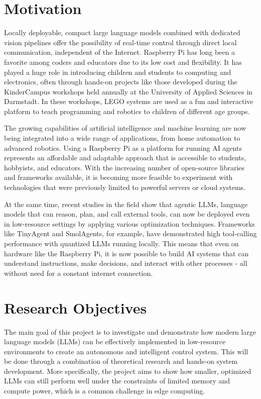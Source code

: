 %
%
\section{Motivation}
\label{sec:intro:motivation}


Locally deployable, compact large language models combined with dedicated vision pipelines offer the possibility of real-time control through direct local communication, independent of the Internet. Raspberry Pi has long been a favorite among coders and educators due to its low cost and flexibility. It has played a huge role in introducing children and students to computing and electronics, often through hands-on projects like those developed during the KinderCampus workshops held annually at the University of Applied Sciences in Darmstadt. In these workshops, LEGO systems are used as a fun and interactive platform to teach programming and robotics to children of different age groups.

The growing capabilities of artificial intelligence and machine learning are now being integrated into a wide range of applications, from home automation to advanced robotics. Using a Raspberry Pi as a platform for running AI agents represents an affordable and adaptable approach that is accessible to students, hobbyists, and educators. With the increasing number of open-source libraries and frameworks available, it is becoming more feasible to experiment with technologies that were previously limited to powerful servers or cloud systems.

At the same time, recent studies in the field show that agentic LLMs, language models that can reason, plan, and call external tools, can now be deployed even in low-resource settings by applying various optimization techniques. Frameworks like TinyAgent and SmolAgents, for example, have demonstrated high tool-calling performance with quantized LLMs running locally. This means that even on hardware like the Raspberry Pi, it is now possible to build AI systems that can understand instructions, make decisions, and interact with other processes - all without need for a constant internet connection.

%
%
\section{Research Objectives}
\label{sec:intro:goal}

The main goal of this project is to investigate and demonstrate how modern large language models (LLMs) can be effectively implemented in low-resource environments to create an autonomous and intelligent control system. This will be done through a combination of theoretical research and hands-on system development. More specifically, the project aims to show how smaller, optimized LLMs can still perform well under the constraints of limited memory and compute power, which is a common challenge in edge computing.

